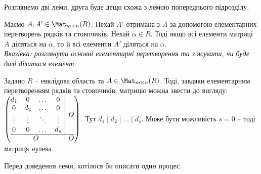 \documentclass{math_library}
\begin{document}
Розглянемо дві леми, друга буде дещо схожа з лемою попереднього підрозділу.
\begin{lemma} Маємо $A,A' \in \Mat_{m \times n}(R)$. Нехай $A'$ отримана з $A$ за допомогою елементарних перетворень рядків та стовпчиків. Нехай $\alpha \in R$. Тоді якщо всі елементи матриці $A$ діляться на $\alpha$, то й всі елементи $A'$ діляться на $\alpha$.\\
\textit{Вказівка: розглянути основні елементарні перетворення та з'ясувати, чи буде далі ділитися елемент.}
\end{lemma}

\begin{lemma}
Задано $R$ -- евклідова область та $A \in \Mat_{m \times n}(R)$. Тоді, завдяки елементарним перетворенням рядків та стовпчиків, матрицю можна звести до вигляду:
$\left(\begin{array}{@{}c|c@{}}
\begin{matrix}
d_1 & 0 & \dots & 0 \\
0 & d_2 & \dots & 0 \\
\vdots & \vdots & \ddots & \vdots \\
0 & 0 & \dots & d_s
\end{matrix} & O \\
\hline
O & O
\end{array} \right)$. Тут $d_1 \mid d_2 \mid \dots \mid d_s$. Може бути можливість $s = 0$ -- тоді матриця нулева.
\end{lemma}

Перед доведення леми, хотілося би описати один процес.
\end{document}
